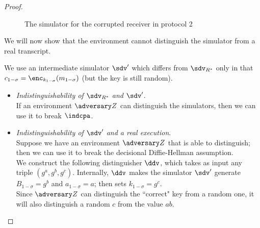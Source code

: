 \begin{proof}
        \begin{figure}
        \begin{center}
        \end{center}
    \caption{The simulator for the corrupted receiver in protocol 2}
    \label{sim_dummy2_receiver}
    \end{figure}

    We will now show that the environment cannot distinguish the simulator from a real transcript.

    We use an intermediate simulator $\sdv'$ which differs from $\sdv_{R^\ast}$ only in that $c_{1-\sigma}=\enc_{k_{1-\sigma}}(m_{1-\sigma})$ (but the key is still random).

    \begin{itemize}
        \item \textit{Indistinguishability of $\sdv_{R^\ast}$ and $\sdv'$}.\\
        If an environment $\zdv$ can distinguish the simulators, then we can use it to break $\indcpa$.
        \item \textit{Indistinguishability of $\sdv'$ and a real execution}.\\
        Suppose we have an environment $\zdv$ that is able to distinguish; then we can use it to break the decisional Diffie-Hellman assumption.\\
        We construct the following distinguisher $\ddv$, which takes as input any triple $(g^a,g^b,g^c)$. Internally, $\ddv$ makes the simulator $\sdv'$ generate $B_{1-\sigma}=g^b$ and $a_{1-\sigma}=a$; then sets $k_{1-\sigma}=g^c$.\\
        Since $\zdv$ can distinguish the ``correct" key from a random one, it will also distinguish a random $c$ from the value $ab$.
    \end{itemize}


\end{proof}
